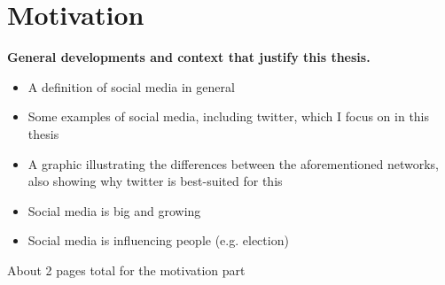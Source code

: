 
\chapter{Motivation}
\label{ch:motivation}

\textbf{General developments and context that justify this thesis.}

\begin{itemize}
    \item
    A definition of social media in general
    \item
    Some examples of social media, including twitter, which I focus on in this thesis
    \item
    A graphic illustrating the differences between the aforementioned networks, also showing why twitter is best-suited for this
    \item
    Social media is big and growing
    \item
    Social media is influencing people (e.g. election)
\end{itemize}

About 2 pages total for the motivation part

\pagebreak[2]